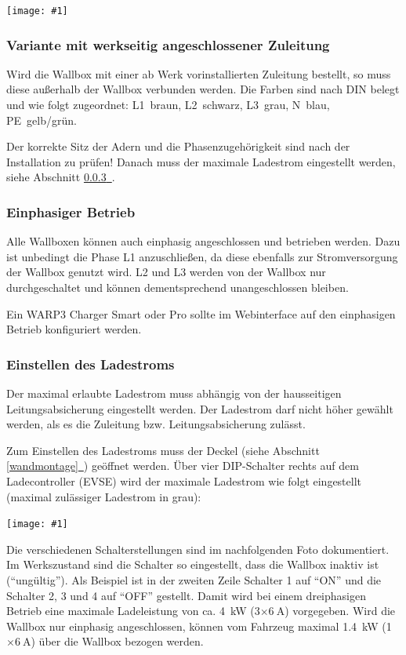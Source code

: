 \documentclass[a4paper,10pt]{article}
\newcommand{\hint}[1]{\begin{tcolorbox}[colback=boxgray,colframe=black,coltext=
white,title=Hinweis,left*=2mm,right*=2mm,boxsep=1mm,bottom=1mm,top=1mm]#1\end{tcolorbox}}
\newcommand{\gfx}[1]{\texttt{[image: \#1]}}
\newcommand*{\fullref}[1]{Abschnitt \hyperref[{#1}]{\ref*{#1}~\nameref*{#1}}}
\begin{document}
\begin{multicols*}{2}
    \gfx{./img_warp3/resized/warp3_back.jpg}

    \vspace{-0.01cm}

    \subsubsection{Variante mit werkseitig angeschlossener Zuleitung}
    Wird die Wallbox mit einer ab Werk vorinstallierten Zuleitung bestellt, so
    muss diese außerhalb der Wallbox verbunden werden. Die Farben sind nach DIN belegt und wie
    folgt zugeordnet: L1~braun, L2~schwarz, L3~grau, N~blau, PE~gelb/grün.

    Der korrekte Sitz der Adern und die Phasenzugehörigkeit sind nach der
    Installation zu prüfen!
    Danach muss der maximale Ladestrom eingestellt werden, siehe
	\fullref{ladestrom_schalter}.

    \subsubsection{Einphasiger Betrieb}
    Alle Wallboxen können auch einphasig angeschlossen und betrieben werden.
    Dazu ist unbedingt die Phase L1 anzuschließen, da diese ebenfalls zur
    Stromversorgung der Wallbox genutzt wird. L2 und L3 werden von der Wallbox
    nur durchgeschaltet und können dementsprechend unangeschlossen bleiben.
    \hint{Ein WARP3 Charger Smart oder Pro sollte im Webinterface auf den
    einphasigen Betrieb konfiguriert werden.}

    \subsubsection{Einstellen des Ladestroms}\label{ladestrom_schalter}
    Der maximal erlaubte Ladestrom muss abhängig von der hausseitigen
    Leitungsabsicherung eingestellt werden. Der Ladestrom darf nicht höher gewählt
    werden, als es die Zuleitung bzw. Leitungsabsicherung zulässt.

    Zum Einstellen des Ladestroms muss der Deckel (siehe \fullref{wandmontage})
    geöffnet werden. Über vier DIP-Schalter rechts auf dem Ladecontroller (EVSE) wird der
    maximale Ladestrom wie folgt eingestellt (maximal zulässiger Ladestrom in grau):

    \gfx{./img_warp3/resized/warp3_switch_location.jpg}

    Die verschiedenen Schalterstellungen sind im nachfolgenden Foto dokumentiert.
    Im Werkszustand sind die Schalter so eingestellt, dass die Wallbox inaktiv
	ist (\enquote{ungültig}).
	Als Beispiel ist in der zweiten Zeile Schalter 1 auf \enquote{ON} und die Schalter 2, 3 und 4 auf \enquote{OFF} gestellt.
    Damit wird bei einem dreiphasigen
    Betrieb eine maximale Ladeleistung von ca. \SI{4}{\kilo\watt} (3$\times\SI{6}{\ampere}$) vorgegeben.
    Wird die Wallbox nur einphasig angeschlossen, können vom Fahrzeug maximal
    \SI{1,4}{\kilo\watt} (1$\times\SI{6}{\ampere}$) über die Wallbox bezogen werden.


\end{multicols*}
\end{document}
